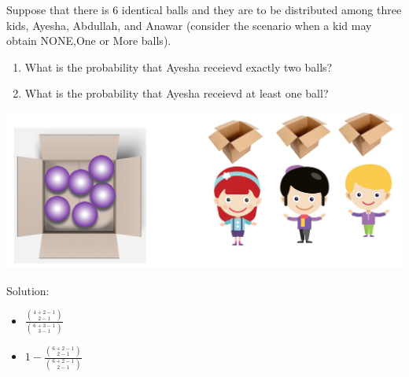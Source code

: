 \documentclass[compress]{beamer}
\begin{document}
\begin{frame}\frametitle{}
Suppose that there is 6 identical balls and they are to be distributed among three kids,  Ayesha, Abdullah, and Anawar  ({\tiny consider the scenario when a kid may obtain NONE,One or More balls}).  
\begin{enumerate}
\item What is the probability that Ayesha receievd exactly two balls?\\
\item  What is the probability that Ayesha receievd at least  one ball?\\
\end{enumerate}

\includegraphics[scale=.32]{figs/6PurpleBass3kids.png}


\pause
{\tiny Solution: 
\begin{itemize}
\item $\frac{ {{4+2-1}\choose {2-1} } }{ {{6+3-1}\choose {3-1}}  }$\item $1- \frac{ {{6+2-1}\choose {2-1} } }{ {{6+2-1}\choose {2-1}}  }$
\end{itemize} 
}
\vspace{.5in}
\end{frame}





%
%
%
%
\end{document}
